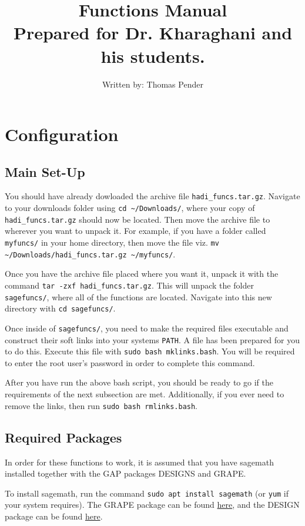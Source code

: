 \documentclass[a4paper,10pt]{article}
\title{{\sc Functions Manual}\\{\small Prepared for Dr. Kharaghani and his students.}}
\author{{\small Written by:} {\sc Thomas Pender}}
\date{}
\begin{document}
\maketitle
\tableofcontents

\section{\centering\sc Configuration}

\subsection{\sc Main Set-Up}
You should have already dowloaded the archive file {\tt hadi\_funcs.tar.gz}. Navigate to your downloads folder using {\tt cd \textasciitilde/Downloads/}, where your copy of {\tt hadi\_funcs.tar.gz} should now be located. Then move the archive file to wherever you want to unpack it. For example, if you have a folder called {\tt myfuncs/} in your home directory, then move the file viz. {\tt mv \textasciitilde/Downloads/hadi\_funcs.tar.gz \textasciitilde/myfuncs/}. 

Once you have the archive file placed where you want it, unpack it with the command {\tt tar -zxf hadi\_funcs.tar.gz}. This will unpack the folder {\tt sagefuncs/}, where all of the functions are located. Navigate into this new directory with {\tt cd sagefuncs/}.

Once inside of {\tt sagefuncs/}, you need to make the required files executable and construct their soft links into your systems {\tt PATH}. A file has been prepared for you to do this. Execute this file with {\tt sudo bash mklinks.bash}. You will be required to enter the root user's password in order to complete this command.

After you have run the above bash script, you should be ready to go if the requirements of the next subsection are met. Additionally, if you ever need to remove the links, then run {\tt sudo bash rmlinks.bash}.

\subsection{\sc Required Packages}
In order for these functions to work, it is assumed that you have sagemath installed together with the GAP packages DESIGNS and GRAPE.

To install sagemath, run the command {\tt sudo apt install sagemath} (or {\tt yum} if your system requires). The GRAPE package can be found \href{https://www.gap-system.org/Packages/grape.html}{here}, and the DESIGN package can be found \href{https://www.gap-system.org/Packages/design.html}{here}.
\end{document}
